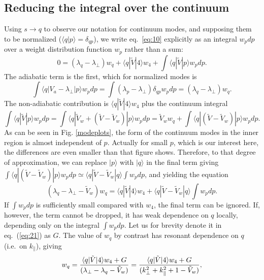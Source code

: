 \documentclass[12pt]{article}
\def\ket#1{|#1\rangle}
\def\bra#1{\langle#1}
\begin{document}
\subsection{Reducing the integral over the continuum}
\label{reducing}
Using $s\to q$ to observe our notation for continuum modes, and
supposing them to be normalized ($\bra{q}\ket{p}=\delta_{qp}$), we write eq.\
\ref{eq:10} explicitly as an integral $w_pdp$ over a
weight distribution function $w_p$ rather than a
sum:
\begin{equation}
  \label{continw}
  0=(\lambda_q-\lambda_\perp)w_q+\bra{q}|\tilde{V}\ket{4}w_4
  +\int\bra{q}|\tilde{V}\ket{p}w_pdp.
\end{equation}
The adiabatic term is the first, which for normalized modes is
\begin{equation}
  \label{eq:contadiab}
  \int\bra{q}|V_a-\lambda_\perp\ket{p}w_pdp = \int
  (\lambda_p-\lambda_\perp)\delta_{qp}w_pdp = (\lambda_q-\lambda_\perp)w_q.
\end{equation}
The non-adiabatic contribution is $\bra{q}|\tilde{V}\ket{4}w_4$ plus the
continuum integral
\begin{equation}
  \label{eq:18}
  \int \bra{q}|\tilde{V}\ket{p}w_pdp=\int\bra{q}|\tilde{V}_{w}+(\tilde{V}-\tilde{V}_{w})\ket{p}w_pdp
  =\tilde{V}_{w}w_q +\int\bra{q}|(\tilde{V}-\tilde{V}_{w})\ket{p}w_pdp.
\end{equation}
As can be seen in Fig. \ref{modeplots}, the form of the continuum
modes in the inner region is almost independent of $p$. Actually for
small $p$, which is our interest here, the differences are even
smaller than that figure shows. Therefore, to that degree of
approximation, we can replace $\ket{p}$ with $\ket{q}$ in the final
term giving $\int\bra{q}|(\tilde{V}-\tilde{V}_{w})\ket{p}w_pdp\simeq
\bra{q}|\tilde{V}-\tilde{V}_{w}\ket{q}\int w_pdp$, and yielding the
equation
\begin{equation}
  \label{eq:21}
  (\lambda_q-\lambda_\perp-\tilde V_w)w_q= \bra{q}|\tilde{V}\ket{4}w_4
  +\bra{q}|\tilde{V}-\tilde{V}_{w}\ket{q}\int w_pdp.
\end{equation}
If $\int w_pdp$ is sufficiently small compared with $w_4$, the final
term can be ignored.  If, however, the term cannot be dropped, it has
weak dependence on $q$ locally, depending only on the integral
$\int w_pdp$. Let us for brevity denote it in eq.\ (\ref{eq:21}) as
$G$. The value of $w_q$ by contrast has resonant dependence on $q$
(i.e.\ on $k_\parallel$),
giving
\begin{equation}
  \label{eq:resonance}
  w_q = {\bra{q}|\tilde{V}\ket{4}w_4+G\over (\lambda_\perp-\lambda_q-\tilde{V}_{w})}
  ={\bra{q}|\tilde{V}\ket{4}w_4+G\over
    (k_\perp^2+k_\parallel^2+1-\tilde V_w) },
\end{equation}
\end{document}
